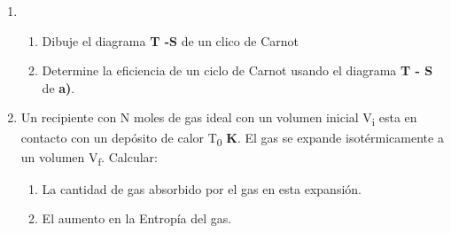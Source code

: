 \documentclass[a4paper,11pt]{extarticle} %
\newcommand{\ut}[1]{\textbf{#1}} %
\begin{document}
\begin{enumerate}[label=\textbf{\arabic*}), leftmargin=*]


    \vspace{\baselineskip}

    

    \vspace{\baselineskip}


    \vspace{\baselineskip}

    

    \vspace{\baselineskip}

    \item{
                \begin{enumerate}[label=\textbf{\alph* )}]
                    \item Dibuje el diagrama \ut{T -S } de un clico de Carnot
                    \item {Determine la eficiencia de un ciclo de Carnot usando el diagrama
                          \ut{T - S} de \ut{a)}}.
                \end{enumerate}
          }

    \vspace{\baselineskip}

    

    \vspace{\baselineskip}

    \item{Un recipiente con N moles de gas ideal con un volumen inicial V\textsubscript{i} esta en contacto con un
          depósito de calor T\textsubscript{0} \ut{K}. El gas se expande isotérmicamente a un volumen V\textsubscript{f}. Calcular:

                \begin{enumerate}[label=\textbf{\alph* )}]
                    \item La cantidad de gas absorbido por el gas en esta expansión.
                    \item El aumento en la Entropía del gas.
                \end{enumerate}
    }

    

    \vspace{\baselineskip}

\end{enumerate}

\end{document}
